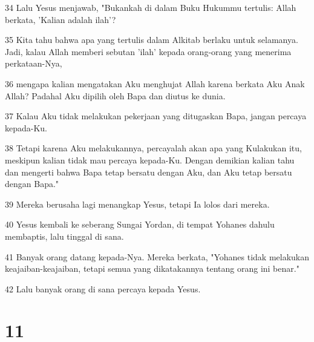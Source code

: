 \par 34 Lalu Yesus menjawab, "Bukankah di dalam Buku Hukummu tertulis: Allah berkata, 'Kalian adalah ilah'?
\par 35 Kita tahu bahwa apa yang tertulis dalam Alkitab berlaku untuk selamanya. Jadi, kalau Allah memberi sebutan 'ilah' kepada orang-orang yang menerima perkataan-Nya,
\par 36 mengapa kalian mengatakan Aku menghujat Allah karena berkata Aku Anak Allah? Padahal Aku dipilih oleh Bapa dan diutus ke dunia.
\par 37 Kalau Aku tidak melakukan pekerjaan yang ditugaskan Bapa, jangan percaya kepada-Ku.
\par 38 Tetapi karena Aku melakukannya, percayalah akan apa yang Kulakukan itu, meskipun kalian tidak mau percaya kepada-Ku. Dengan demikian kalian tahu dan mengerti bahwa Bapa tetap bersatu dengan Aku, dan Aku tetap bersatu dengan Bapa."
\par 39 Mereka berusaha lagi menangkap Yesus, tetapi Ia lolos dari mereka.
\par 40 Yesus kembali ke seberang Sungai Yordan, di tempat Yohanes dahulu membaptis, lalu tinggal di sana.
\par 41 Banyak orang datang kepada-Nya. Mereka berkata, "Yohanes tidak melakukan keajaiban-keajaiban, tetapi semua yang dikatakannya tentang orang ini benar."
\par 42 Lalu banyak orang di sana percaya kepada Yesus.

\chapter{11}

